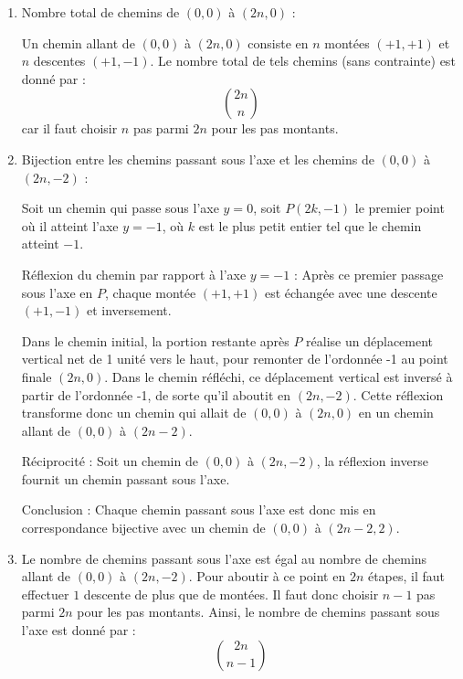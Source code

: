 \documentclass[10pt,a4paper]{article}
\begin{document}
\begin{enumerate}
    \item Nombre total de chemins de $(0,0)$ à $(2n,0)$ :

    Un chemin allant de \( (0,0) \) à \( (2n,0) \) consiste en \( n \) montées \( (+1, +1) \) et \(
    n \) descentes \( (+1, -1) \). Le nombre total de tels chemins (sans contrainte) est donné par :
    \[ \binom{2n}{n} \]
    car il faut choisir $n$ pas parmi $2n$ pour les pas montants.

    \item Bijection entre les chemins passant sous l'axe et les chemins de $(0,0)$ à $(2n,-2)$ :

    Soit un chemin qui passe sous l'axe \( y=0 \), soit \( P(2k, -1) \) le premier point où il
    atteint l'axe \( y=-1 \), où \( k \) est le plus petit entier tel que le chemin atteint \( -1
    \).

    Réflexion du chemin par rapport à l'axe \( y=-1 \) : Après ce premier passage sous l'axe en
    \( P \), chaque montée \( (+1,+1) \) est échangée avec une descente \( (+1,-1) \) et
    inversement.

    Dans le chemin initial, la portion restante après $ P $ réalise un déplacement vertical net de 1
    unité vers le haut, pour remonter de l'ordonnée -1 au point finale \( (2n,0) \). Dans le chemin
    réfléchi, ce déplacement vertical est inversé à partir de l'ordonnée -1, de sorte qu'il aboutit
    en \( (2n,-2) \). Cette réflexion transforme donc un chemin qui allait de \( (0,0) \) à \(
    (2n,0) \) en un chemin allant de \( (0,0) \) à \( (2n-2) \).

    Réciprocité : Soit un chemin de \( (0,0) \) à \( (2n,-2) \), la réflexion inverse fournit un
    chemin passant sous l'axe.

    Conclusion : Chaque chemin passant sous l'axe est donc mis en correspondance bijective avec un
    chemin de \( (0,0) \) à \( (2n-2,2) \).

    

    \item Le nombre de chemins passant sous l'axe  est égal au nombre de chemins allant de \( (0,0)
    \) à \( (2n,-2) \). Pour aboutir à ce point en $2n$ étapes, il faut effectuer \( 1 \) descente
    de plus que de montées. Il faut donc choisir \( n-1 \) pas parmi \( 2n \) pour les pas montants.
    Ainsi, le nombre de chemins passant sous l'axe est donné par :
    \[
    \binom{2n}{n-1}
    \]


\end{enumerate}
\end{document}
